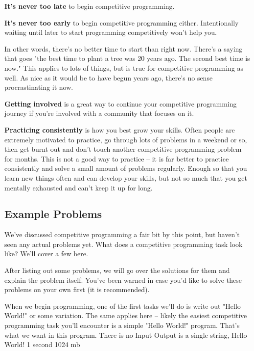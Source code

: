 \textbf{It's never too late} to begin competitive programming.

\textbf{It's never too early} to begin competitive programming either. Intentionally waiting until later to start programming competitively won't help you.

In other words, there's no better time to start than right now. There's a saying that goes "the best time to plant a tree was 20 years ago. The second best time is now." This applies to lots of things, but is true for competitive programming as well. As nice as it would be to have begun years ago, there's no sense procrastinating it now.

\textbf{Getting involved} is a great way to continue your competitive programming journey if you're involved with a community that focuses on it.

\textbf{Practicing consistently} is how you best grow your skills. Often people are extremely motivated to practice, go through lots of problems in a weekend or so, then get burnt out and don't touch another competitive programming problem for months. This is not a good way to practice -- it is far better to practice consistently and solve a small amount of problems regularly. Enough so that you learn new things often and can develop your skills, but not so much that you get mentally exhausted and can't keep it up for long.

\subsection{Example Problems}

We've discussed competitive programming a fair bit by this point, but haven't seen any actual problems yet. What does a competitive programming task look like? We'll cover a few here.

After listing out some problems, we will go over the solutions for them and explain the problem itself. You've been warned in case you'd like to solve these problems on your own first (it is recommended).

\hrulefill

{When we begin programming, one of the first tasks we'll do is write out "Hello World!" or some variation. The same applies here -- likely the easiest competitive programming task you'll encounter is a simple "Hello World!" program. That's what we want in this program.}
{There is no Input}
{Output is a single string, Hello World!}
{1 second}
{1024 mb}
{}

